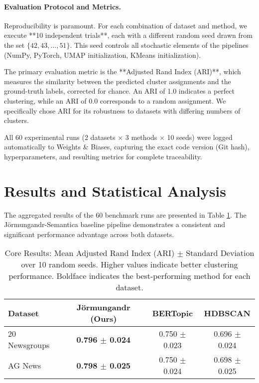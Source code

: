 \paragraph{Evaluation Protocol and Metrics.}
Reproducibility is paramount. For each combination of dataset and method, we execute **10 independent trials**, each with a different random seed drawn from the set $\{42, 43, \dots, 51\}$. This seed controls all stochastic elements of the pipelines (NumPy, PyTorch, UMAP initialization, KMeans initialization).

The primary evaluation metric is the **Adjusted Rand Index (ARI)**, which measures the similarity between the predicted cluster assignments and the ground-truth labels, corrected for chance. An ARI of 1.0 indicates a perfect clustering, while an ARI of 0.0 corresponds to a random assignment. We specifically chose ARI for its robustness to datasets with differing numbers of clusters.

All 60 experimental runs (2 datasets $\times$ 3 methods $\times$ 10 seeds) were logged automatically to Weights \& Biases, capturing the exact code version (Git hash), hyperparameters, and resulting metrics for complete traceability.

\section{Results and Statistical Analysis}
\label{sec:results}
The aggregated results of the 60 benchmark runs are presented in Table \ref{tab:main_results_full}. The Jörmungandr-Semantica baseline pipeline demonstrates a consistent and significant performance advantage across both datasets.

\begin{table}[h!]
\centering
\caption{Core Results: Mean Adjusted Rand Index (ARI) $\pm$ Standard Deviation over 10 random seeds. Higher values indicate better clustering performance. Boldface indicates the best-performing method for each dataset.}
\label{tab:main_results_full}
\begin{tabular}{@{}lccc@{}}
\toprule
\textbf{Dataset} & \textbf{Jörmungandr (Ours)} & \textbf{BERTopic} & \textbf{HDBSCAN} \\ \midrule
20 Newsgroups    & \textbf{0.796 $\pm$ 0.024} & 0.750 $\pm$ 0.023     & 0.696 $\pm$ 0.024    \\
AG News          & \textbf{0.798 $\pm$ 0.025} & 0.750 $\pm$ 0.024     & 0.698 $\pm$ 0.025    \\ \bottomrule
\end{tabular}
\end{table}

